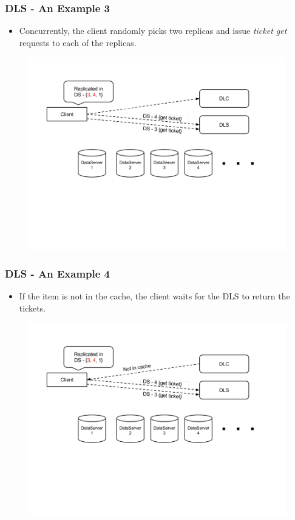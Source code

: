 \documentclass{beamer}
\begin{document}
\begin{frame}
  \frametitle{DLS - An Example 3}
  \begin{itemize}
  \item Concurrently, the client randomly picks two replicas and
    issue \textit{ticket get} requests to each of the replicas.
  \end{itemize}
  \begin{figure}
    \begin{center}
      \centerline{\includegraphics[scale=0.40]{img/DLS_Example4.png}}
    \end{center}
  \end{figure}
\end{frame}

\begin{frame}
  \frametitle{DLS - An Example 4}
  \begin{itemize}
  \item If the item is not in the cache, the client waits for the DLS to
    return the tickets.
  \end{itemize}
  \begin{figure}
    \begin{center}
      \centerline{\includegraphics[scale=0.40]{img/DLS_Example5.png}}
    \end{center}
  \end{figure}
\end{frame}
\end{document}
